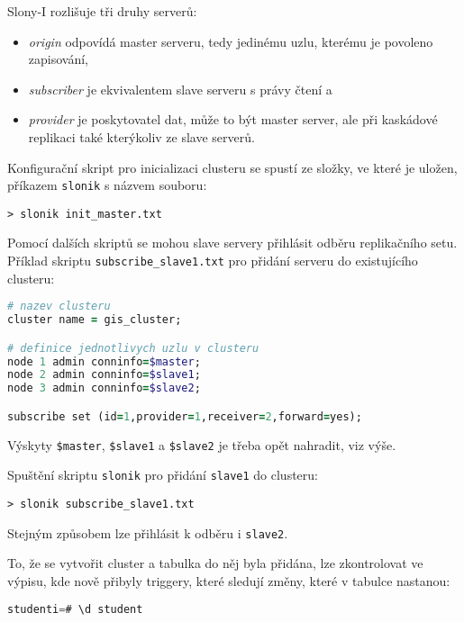 Slony-I rozlišuje tři druhy serverů:
\begin{itemize}
  \item {\it origin} odpovídá master serveru, tedy jedinému uzlu, kterému je povoleno
    zapisování,
  \item {\it subscriber} je ekvivalentem slave serveru s právy čtení a
  \item {\it provider} je poskytovatel dat, může to být master server, ale při kaskádové
    replikaci také kterýkoliv ze slave serverů.
\end{itemize}

Konfigurační skript pro inicializaci clusteru se spustí ze složky, ve které je
uložen, příkazem \texttt{slonik} s názvem souboru:

\begin{lstlisting}
> slonik init_master.txt
\end{lstlisting}

Pomocí dalších skriptů se mohou slave servery přihlásit odběru replikačního
setu. Příklad skriptu \texttt{subscribe\_slave1.txt} pro přidání serveru do
existujícího clusteru:
\begin{lstlisting}[language=ruby]
# nazev clusteru
cluster name = gis_cluster;

# definice jednotlivych uzlu v clusteru
node 1 admin conninfo=$master;
node 2 admin conninfo=$slave1;
node 3 admin conninfo=$slave2;

subscribe set (id=1,provider=1,receiver=2,forward=yes);
\end{lstlisting}
Výskyty \texttt{\$master}, \texttt{\$slave1} a \texttt{\$slave2} je třeba opět
nahradit, viz výše.

Spuštění skriptu \texttt{slonik} pro přidání \texttt{slave1} do clusteru:
\begin{lstlisting}
> slonik subscribe_slave1.txt
\end{lstlisting}
Stejným způsobem lze přihlásit k odběru i \texttt{slave2}.

To, že se vytvořit cluster a tabulka do něj byla přidána, lze zkontrolovat ve
výpisu, kde nově přibyly triggery, které sledují změny, které v tabulce
nastanou:

\begin{lstlisting}[language=sql]
studenti=# \d student
\end{lstlisting}

